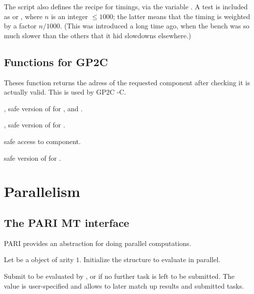 \item The  script also defines the recipe for
 timings, via the variable . A test is
included as  or , where $n$ is an integer $\leq 1000$;
the latter means that the timing is weighted by a factor $n/1000$. (This was
introduced a long time ago, when the  bench was so much slower
than the others that it hid slowdowns elsewhere.)

\section{Functions for GP2C}


Theses function returns the adress of the requested component after checking
it is actually valid. This is used by GP2C -C.

, safe version of  for ,
 and .

, safe version of  for .

 safe access to  component.

 safe version of
 for .

\chapter{Parallelism}

\section{The PARI MT interface}

PARI provides an abstraction for doing parallel computations.

 Let 
be a  object of arity $1$.  Initialize the structure 
to evaluate  in parallel.

 Submit
 to be evaluated by , or  if no further task
is left to be submitted. The value  is user-specified and allows
to later match up results and submitted tasks.

